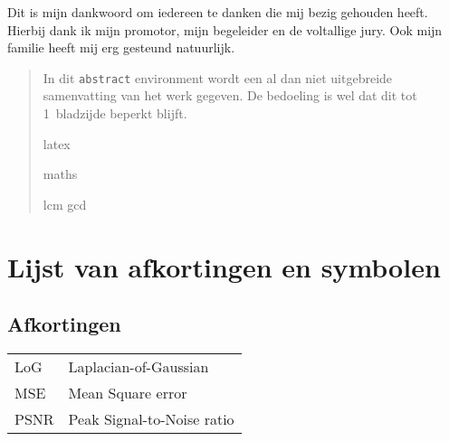 \documentclass[master=ucll,11pt,dutch,twoside]{kulemt}
\newcommand{\quotes}[1]{``#1''}
\begin{document}
\begin{preface}
  Dit is mijn dankwoord om iedereen te danken die mij bezig gehouden heeft.
  Hierbij dank ik mijn promotor, mijn begeleider en de voltallige jury.
  Ook mijn familie heeft mij erg gesteund natuurlijk.
\end{preface}

\tableofcontents*

\begin{abstract}
  In dit \texttt{abstract} environment wordt een al dan niet uitgebreide
  samenvatting van het werk gegeven. De bedoeling is wel dat dit tot
  1~bladzijde beperkt blijft.

  \lipsum[1]
    
    
    \Gls{latex}
    
    \gls{maths}
    
    \acrfull{lcm}
\acrlong{gcd}

\end{abstract}

\listoffiguresandtables

\chapter{Lijst van afkortingen en symbolen}
\section*{Afkortingen}
\begin{flushleft}
  \renewcommand{\arraystretch}{1.1}
  \begin{tabularx}{\textwidth}{@{}p{12mm}X@{}}
    LoG   & Laplacian-of-Gaussian \\
    MSE   & Mean Square error \\
    PSNR  & Peak Signal-to-Noise ratio \\
  \end{tabularx}
\end{flushleft}
\end{document}
